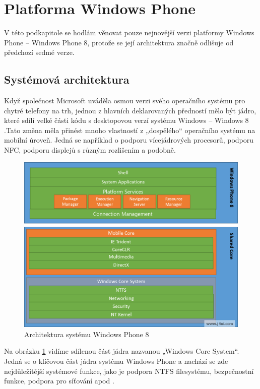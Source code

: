 \section{Platforma Windows Phone}
V této podkapitole se hodlám věnovat pouze nejnovější verzi platformy Windows Phone – Windows Phone 8, protože se její architektura značně odlišuje od předchozí sedmé verze.

\subsection{Systémová architektura}
Když společnost Microsoft uváděla osmou verzi svého operačního systému pro chytré telefony na trh, jednou z hlavních deklarovaných předností mělo být jádro, které sdílí velké části kódu s desktopovou verzí systému Windows – Windows 8 \cite{announcing_wp8}.Tato změna měla přinést mnoho vlastností z „dospělého“ operačního systému na mobilní úroveň. Jedná se například o podporu vícejádrových procesorů, podporu NFC, podporu displejů s různým rozlišením a podobně.

\begin{figure}\centering
\includegraphics[width=1.0\textwidth]{WP8Architecture.png}
\caption{Architektura systému Windows Phone 8 \cite{wp8_kernel_architecture}}
\label{fig:WP8Architecture}
\end{figure}

Na obrázku \ref{fig:WP8Architecture} vidíme sdílenou část jádra nazvanou „Windows Core System“. Jedná se o klíčovou část jádra systému Windows Phone a nachází se zde nejdůležitější systémové funkce, jako je podpora NTFS filesystému, bezpečnostní funkce, podpora pro síťování apod \cite{wp8_kernel_architecture}. 

